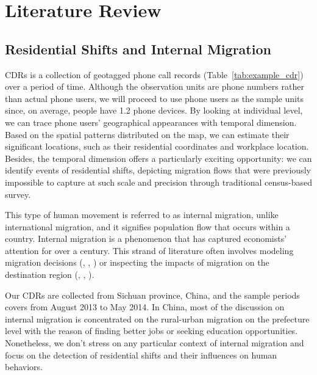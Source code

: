 \chapter{Literature Review}
\section{Residential Shifts and Internal Migration}\label{sec:2_residential_shift_and_internal_migration}
CDRs is a collection of geotagged phone call records (Table~\ref{tab:example_cdr}) over a period of time.
Although the observation units are phone numbers rather than actual phone users, we will proceed to use phone users as the sample units since, on average, people have 1.2 phone devices.
By looking at individual level, we can trace phone users' geographical appearances with temporal dimension.
Based on the spatial patterns distributed on the map, we can estimate their significant locations, such as their residential coordinates and workplace location.
Besides, the temporal dimension offers a particularly exciting opportunity: we can identify events of residential shifts, depicting migration flows that were previously impossible to capture at such scale and precision through traditional census-based survey.


This type of human movement is referred to as internal migration, unlike international migration, and it signifies population flow that occurs within a country.
Internal migration is a phenomenon that has captured economists' attention for over a century.
This strand of literature often involves modeling migration decisions (\cite{hunt2004north}, \cite{espindola2006harris}, \cite{wang2023job}) or inspecting the impacts of migration on the destination region (\cite{boustan2010effect}, \cite{bryan2019aggregate}, \cite{imbert2022migrants}).

Our CDRs are collected from Sichuan province, China, and the sample periods covers from August 2013 to May 2014. In China, most of the discussion on internal migration is concentrated on the rural-urban migration on the prefecture level with the reason of finding better jobs or seeking education opportunities. Nonetheless, we don't stress on any particular context of internal migration and focus on the detection of residential shifts and their influences on human behaviors.

